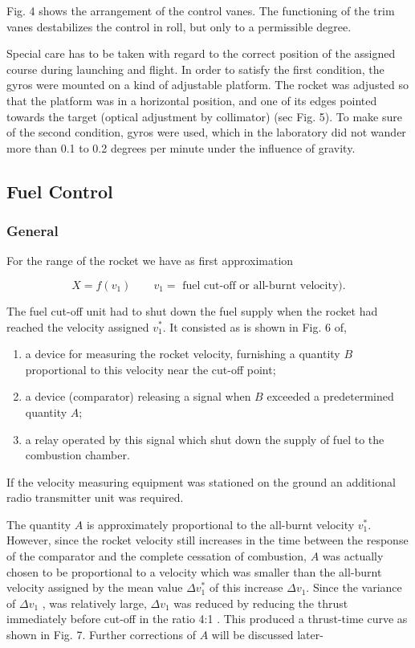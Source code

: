 \documentclass[12pt, a4paper]{article}
\begin{document}
Fig. 4 shows the arrangement of the control vanes. The functioning of the trim vanes destabilizes the control in roll, but only to a permissible degree.

Special care has to be taken with regard to the correct position of the assigned course during launching and flight. In order to satisfy the first condition, the gyros were mounted on a kind of adjustable platform. The rocket was adjusted so that the platform was in a horizontal position, and one of its edges pointed towards the target (optical adjustment by collimator) (sec Fig. 5). To make sure of the second condition, gyros were used, which in the laboratory did not wander more than 0.1 to 0.2 degrees per minute under the influence of gravity.

\subsection{Fuel Control}

\subsubsection*{General}

For the range of the rocket we have as first approximation

\begin{equation}
  X=f(v_{1})\quad\quad v_{1}=\text{ fuel cut-off or all-burnt velocity).}
\end{equation}

The fuel cut-off unit had to shut down the fuel supply when the rocket had
reached the velocity assigned $v_{1}^{*}$. It consisted as is shown in Fig. 6 of,

\begin{enumerate}
  \item a device for measuring the rocket velocity, furnishing a quantity $B$ proportional to this velocity near the cut-off point;
  \item a device (comparator) releasing a signal when $B$ exceeded a predetermined
quantity $A$;
  \item a relay operated by this signal which shut down the supply of fuel to the
combustion chamber.
\end{enumerate}

If the velocity measuring equipment was stationed on the ground an additional radio transmitter unit was required.

The quantity $A$ is approximately proportional to the all-burnt velocity $v_{1}^{*}$. However, since the rocket velocity still increases in the time between the response of the comparator and the complete cessation of combustion, $A$ was actually chosen to be proportional to a velocity which was smaller than the all-burnt velocity assigned by the mean value $\Delta v_{1}^{*}$ of this increase $\Delta v_{1} $. Since the variance of $\Delta v_{1}$ , was relatively large, $\Delta v_{1}$  was reduced by reducing the thrust immediately before cut-off in the ratio 4:1 . This produced a thrust-time curve as shown in Fig. 7. Further corrections of $A$ will be discussed later-
\end{document}
